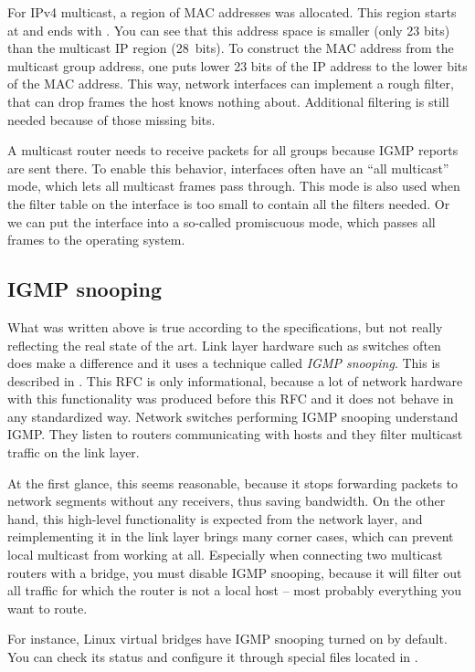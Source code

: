 For IPv4 multicast, a region of MAC addresses was allocated. This region starts
at  and ends with . You can see
that this address space is smaller (only 23 bits) than the multicast IP region
(28~bits). To construct the MAC address from the multicast group address, one
puts lower 23 bits of the IP address to the lower bits of the MAC address. This
way, network interfaces can implement a rough filter, that can drop frames the
host knows nothing about. Additional filtering is still needed because of those
missing bits.

A multicast router needs to receive packets for all groups because IGMP reports
are sent there. To enable this behavior, interfaces often have an ``all multicast''
mode, which lets all multicast frames pass through. This mode is also used when
the filter table on the interface is too small to contain all the filters needed. Or
we can put the interface into a so-called promiscuous mode, which passes all frames
to the operating system.

\subsection{IGMP snooping}

What was written above is true according to the specifications, but not really
reflecting the real state of the art. Link layer hardware such as switches often does
make a difference and it uses a technique called \emph{IGMP snooping}. This is described
in . This RFC is only informational, because a lot of network hardware with
this functionality was produced before this RFC and it does not behave in any
standardized way. Network switches performing IGMP snooping understand IGMP. They
listen to routers communicating with hosts and they filter multicast traffic on
the link layer.

At the first glance, this seems reasonable, because it stops forwarding packets
to network segments without any receivers, thus saving bandwidth. On the other
hand, this high-level functionality is expected from the network layer, and
reimplementing it in the link layer brings many corner cases, which can prevent
local multicast from working at all. Especially when connecting two multicast
routers with a bridge, you must disable IGMP snooping, because it will filter
out all traffic for which the router is not a local host -- most probably
everything you want to route.

For instance, Linux virtual bridges have IGMP snooping turned on by default.
You can check its status and configure it through special files located in
.

